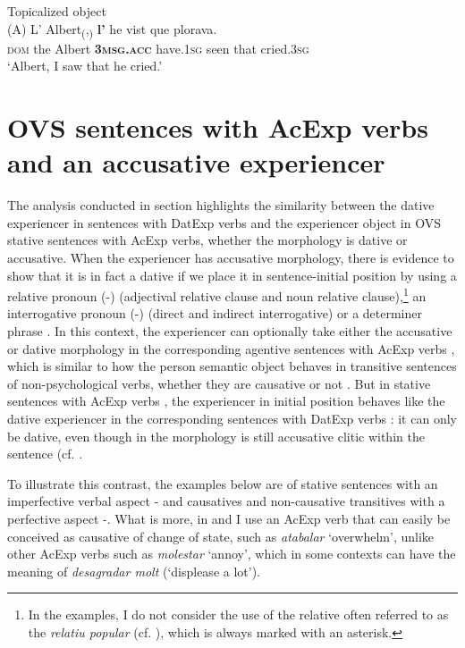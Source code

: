 \documentclass[output=paper,colorlinks,citecolor=brown,modfonts,nonflat]{langsci/langscibook}
\begin{document}
{{ \ex Topicalized object\label{ex:royo:13d}\\
 \gll (A) L’ Albert\textsubscript{(},\textsubscript{)} \textbf{l’} he vist que plorava.\\
\textsc{dom}  the Albert \textbf{\textsc{3msg.acc}} have.\textsc{1sg} seen that cried.\textsc{3sg}\\
\glt ‘Albert, I saw that he cried.’
 \z
 \z


\section{OVS sentences with AcExp verbs and an accusative experiencer}\label{sec:royo:4}

The analysis conducted in section  highlights the similarity between the dative experiencer in sentences with DatExp verbs and the experiencer object in OVS stative sentences with AcExp verbs, whether the morphology is dative or accusative. When the experiencer has accusative morphology, there is evidence to show that it is in fact a dative if we place it in sentence-initial position by using a relative pronoun (-) (adjectival relative clause and noun relative clause),\footnote{In the examples, I do not consider the use of the relative often referred to as the \textit{relatiu popular} (cf. \citealt[154--155]{Ginebra2005}), which is always marked with an asterisk.} an interrogative pronoun (-) (direct and indirect interrogative) or a determiner phrase . In this context, the experiencer can optionally take either the accusative or dative morphology in the corresponding agentive sentences with AcExp verbs , which is similar to how the person semantic object behaves in transitive sentences of non-psychological verbs, whether they are causative or not . But in stative sentences with AcExp verbs , the experiencer in initial position behaves like the dative experiencer in the corresponding sentences with DatExp verbs : it can only be dative, even though in  the morphology is still accusative clitic within the sentence (cf. \citealt[Section 4.3.4]{Royo2017}.

To illustrate this contrast, the examples below are of stative sentences with an imperfective verbal aspect - and causatives and non-causative transitives with a perfective aspect -. What is more, in  and  I use an AcExp verb that can easily be conceived as causative of change of state, such as \textit{atabalar} ‘overwhelm’, unlike other AcExp verbs such as \textit{molestar} ‘annoy’, which in some contexts can have the meaning of  \textit{desagradar molt} (‘displease a lot’).

}}
\end{document}

